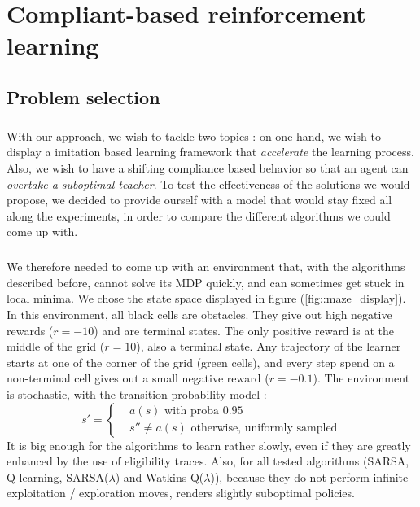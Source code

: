 \documentclass[a4paper]{report}
\begin{document}
	\chapter{Compliant-based reinforcement learning}
	{
		\section{Problem selection}
		{
			\paragraph{} With our approach, we wish to tackle two topics : on one hand, we wish to display a imitation based learning framework that \emph{accelerate} the learning process. Also, we wish to have a shifting compliance based behavior so that an agent can \emph{overtake a suboptimal teacher}. To test the effectiveness of the solutions we would propose, we decided to provide ourself with a model that would stay fixed all along the experiments, in order to compare the different algorithms we could come up with. 
			
			\paragraph{} We therefore needed to come up with an environment that, with the algorithms described before, cannot solve its MDP quickly, and can sometimes get stuck in local minima. We chose the state space displayed in figure (\ref{fig::maze_display}). In this environment, all black cells are obstacles. They give out high negative rewards ($r=-10$) and are terminal states. The only positive reward is at the middle of the grid ($r=10$), also a terminal state. Any trajectory of the learner starts at one of the corner of the grid (green cells), and every step spend on a non-terminal cell gives out a small negative reward ($r=-0.1$). The environment is stochastic, with the transition probability model : 
			\begin{equation}
				s' = \left\{ 
					\begin{aligned}
						&a(s) \text{ with proba } 0.95 \\
						&s'' \neq a(s) \text{ otherwise, uniformly sampled}
					\end{aligned}\right.
			\end{equation}
			 It is big enough for the algorithms to learn rather slowly, even if they are greatly enhanced by the use of eligibility traces. Also, for all tested algorithms (SARSA, Q-learning, SARSA($\lambda$) and Watkins Q($\lambda$)), because they do not perform infinite exploitation / exploration moves, renders slightly suboptimal policies.
			
}}
\end{document}
